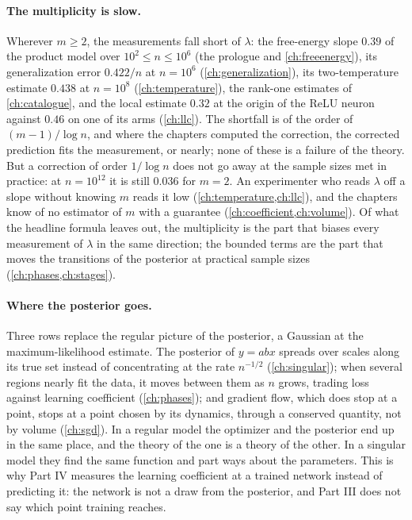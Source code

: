 \begin{refsection}
\paragraph{The multiplicity is slow.} Wherever $m\ge2$, the measurements fall short of $\lambda$: the free-energy slope $0.39$ of the product model over $10^2\le n\le10^6$ (the prologue and \cref{ch:freeenergy}), its generalization error $0.422/n$ at $n=10^6$ (\cref{ch:generalization}), its two-temperature estimate $0.438$ at $n=10^8$ (\cref{ch:temperature}), the rank-one estimates of \cref{ch:catalogue}, and the local estimate $0.32$ at the origin of the ReLU neuron against $0.46$ on one of its arms (\cref{ch:llc}). The shortfall is of the order of $(m-1)/\log n$, and where the chapters computed the correction, the corrected prediction fits the measurement, or nearly; none of these is a failure of the theory. But a correction of order $1/\log n$ does not go away at the sample sizes met in practice: at $n=10^{12}$ it is still $0.036$ for $m=2$. An experimenter who reads $\lambda$ off a slope without knowing $m$ reads it low (\cref{ch:temperature,ch:llc}), and the chapters know of no estimator of $m$ with a guarantee (\cref{ch:coefficient,ch:volume}). Of what the headline formula leaves out, the multiplicity is the part that biases every measurement of $\lambda$ in the same direction; the bounded terms are the part that moves the transitions of the posterior at practical sample sizes (\cref{ch:phases,ch:stages}).

\paragraph{Where the posterior goes.} Three rows replace the regular picture of the posterior, a Gaussian at the maximum-likelihood estimate. The posterior of $y=abx$ spreads over scales along its true set instead of concentrating at the rate $n^{-1/2}$ (\cref{ch:singular}); when several regions nearly fit the data, it moves between them as $n$ grows, trading loss against learning coefficient (\cref{ch:phases}); and gradient flow, which does stop at a point, stops at a point chosen by its dynamics, through a conserved quantity, not by volume (\cref{ch:sgd}). In a regular model the optimizer and the posterior end up in the same place, and the theory of the one is a theory of the other. In a singular model they find the same function and part ways about the parameters. This is why Part IV measures the learning coefficient at a trained network instead of predicting it: the network is not a draw from the posterior, and Part III does not say which point training reaches.


\end{refsection}
